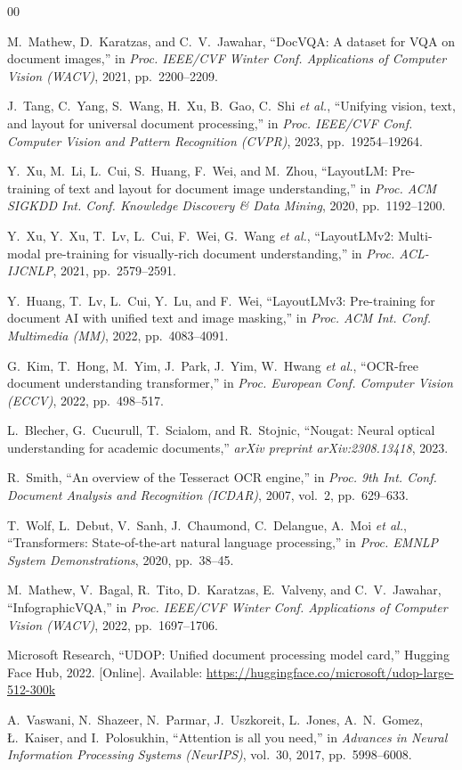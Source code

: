 \documentclass[conference]{IEEEtran}
\begin{document}
\begin{thebibliography}{00}

M.~Mathew, D.~Karatzas, and C.~V.~Jawahar,
``DocVQA: A dataset for VQA on document images,''
in \emph{Proc. IEEE/CVF Winter Conf. Applications of Computer Vision (WACV)},
2021, pp.\ 2200--2209.

J.~Tang, C.~Yang, S.~Wang, H.~Xu, B.~Gao, C.~Shi \emph{et al.},
``Unifying vision, text, and layout for universal document processing,''
in \emph{Proc. IEEE/CVF Conf. Computer Vision and Pattern Recognition (CVPR)},
2023, pp.\ 19254--19264.

Y.~Xu, M.~Li, L.~Cui, S.~Huang, F.~Wei, and M.~Zhou,
``LayoutLM: Pre-training of text and layout for document image understanding,''
in \emph{Proc. ACM SIGKDD Int. Conf. Knowledge Discovery \& Data Mining},
2020, pp.\ 1192--1200.

Y.~Xu, Y.~Xu, T.~Lv, L.~Cui, F.~Wei, G.~Wang \emph{et al.},
``LayoutLMv2: Multi-modal pre-training for visually-rich document understanding,''
in \emph{Proc. ACL-IJCNLP},
2021, pp.\ 2579--2591.

Y.~Huang, T.~Lv, L.~Cui, Y.~Lu, and F.~Wei,
``LayoutLMv3: Pre-training for document AI with unified text and image masking,''
in \emph{Proc. ACM Int. Conf. Multimedia (MM)},
2022, pp.\ 4083--4091.

G.~Kim, T.~Hong, M.~Yim, J.~Park, J.~Yim, W.~Hwang \emph{et al.},
``OCR-free document understanding transformer,''
in \emph{Proc. European Conf. Computer Vision (ECCV)},
2022, pp.\ 498--517.

L.~Blecher, G.~Cucurull, T.~Scialom, and R.~Stojnic,
``Nougat: Neural optical understanding for academic documents,''
\emph{arXiv preprint arXiv:2308.13418}, 2023.

R.~Smith,
``An overview of the Tesseract OCR engine,''
in \emph{Proc. 9th Int. Conf. Document Analysis and Recognition (ICDAR)},
2007, vol.~2, pp.\ 629--633.

T.~Wolf, L.~Debut, V.~Sanh, J.~Chaumond, C.~Delangue, A.~Moi \emph{et al.},
``Transformers: State-of-the-art natural language processing,''
in \emph{Proc. EMNLP System Demonstrations},
2020, pp.\ 38--45.

M.~Mathew, V.~Bagal, R.~Tito, D.~Karatzas, E.~Valveny, and C.~V.~Jawahar,
``InfographicVQA,''
in \emph{Proc. IEEE/CVF Winter Conf. Applications of Computer Vision (WACV)},
2022, pp.\ 1697--1706.

Microsoft Research,
``UDOP: Unified document processing model card,''
Hugging Face Hub, 2022.
[Online]. Available: \url{https://huggingface.co/microsoft/udop-large-512-300k}

A.~Vaswani, N.~Shazeer, N.~Parmar, J.~Uszkoreit, L.~Jones, A.~N.~Gomez,
\L.~Kaiser, and I.~Polosukhin,
``Attention is all you need,''
in \emph{Advances in Neural Information Processing Systems (NeurIPS)},
vol.~30, 2017, pp.\ 5998--6008.

\end{thebibliography}
\end{document}
